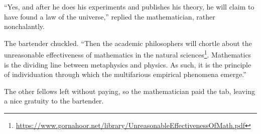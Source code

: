``Yes, and after he does his experiments and publishes his theory, he will claim to have found a law of the universe,'' replied the mathematician, rather nonchalantly.

The bartender chuckled. ``Then the academic philosophers will chortle about the unreasonable effectiveness of mathematics in the natural sciences\footnote{\url{https://www.gornahoor.net/library/UnreasonableEffectivenessOfMath.pdf}}. Mathematics is the dividing line between metaphysics and physics. As such, it is the principle of individuation through which the multifarious empirical phenomena emerge.''

The other fellows left without paying, so the mathematician paid the tab, leaving a nice gratuity to the bartender.



